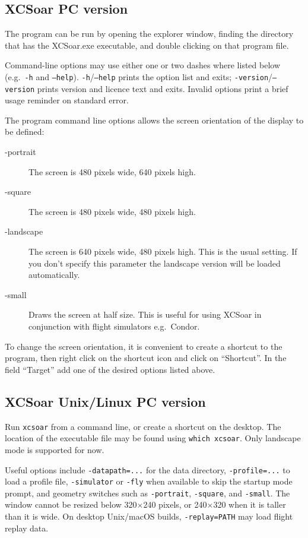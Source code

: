 \subsection*{XCSoar PC version}
The program can be run by opening the explorer window, finding the directory
that has the XCSoar.exe executable, and double clicking on that program file.

Command-line options may use either one or two dashes where listed below (e.g.\
\texttt{-h} and \texttt{--help}).
\texttt{-h}/\texttt{--help} prints the option list and exits;
\texttt{-version}/\texttt{--version} prints version and licence text and exits.
Invalid options print a brief usage reminder on standard error.

The program command line options allows the screen orientation of
the display to be defined:
\begin{description}
\item[-portrait] The screen is 480 pixels wide, 640 pixels high.
\item[-square] The screen is 480 pixels wide, 480 pixels high.
\item[-landscape] The screen is 640 pixels wide, 480 pixels high. This is the
usual setting. If you don't specify this parameter the landscape version will be
loaded automatically.
\item[-small] Draws the screen at half size.  This is useful for using XCSoar in
 conjunction with flight simulators e.g.\ Condor.
\end{description}
To change the screen orientation, it is convenient to create a shortcut to the
program, then right click on the shortcut icon and click on ``Shortcut''. 
In the field ``Target'' add one of the desired options listed above.

\subsection*{XCSoar Unix/Linux PC version}
Run \verb|xcsoar| from a command line, or create a shortcut on the
desktop.  The location of the executable file may be found using
\verb|which xcsoar|.  Only landscape mode is  supported for now.

Useful options include \verb|-datapath=...| for the data directory,
\verb|-profile=...| to load a profile file, \verb|-simulator| or \verb|-fly|
when available to skip the startup mode prompt, and geometry switches such as
\verb|-portrait|, \verb|-square|, and \verb|-small|.
The window cannot be resized below 320$\times$240 pixels, or
240$\times$320 when it is taller than it is wide.
On desktop Unix/macOS builds, \verb|-replay=PATH| may load flight replay data.


